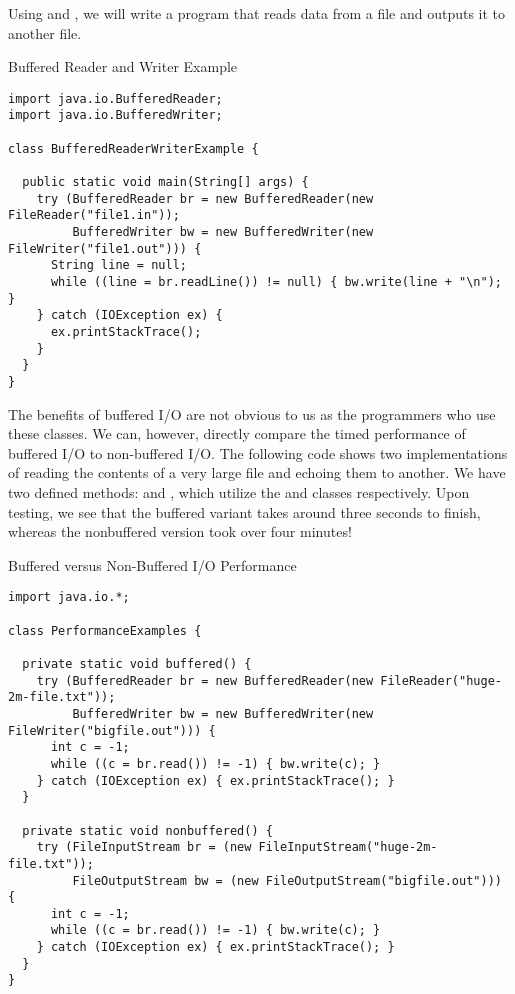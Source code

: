 \example Using  and , we will write a program that reads data from a file and outputs it to another file.

\begin{cl}{Buffered Reader and Writer Example}
\begin{lstlisting}[language=MyJava]
import java.io.BufferedReader;
import java.io.BufferedWriter;

class BufferedReaderWriterExample {

  public static void main(String[] args) {
    try (BufferedReader br = new BufferedReader(new FileReader("file1.in"));
         BufferedWriter bw = new BufferedWriter(new FileWriter("file1.out"))) {
      String line = null;
      while ((line = br.readLine()) != null) { bw.write(line + "\n"); }
    } catch (IOException ex) {
      ex.printStackTrace();
    }
  }
}
\end{lstlisting}
\end{cl}

The benefits of buffered I/O are not obvious to us as the programmers who use these classes. We can, however, directly compare the timed performance of buffered I/O to non-buffered I/O. The following code shows two implementations of reading the contents of a very large file and echoing them to another. We have two defined methods:  and , which utilize the  and  classes respectively. Upon testing, we see that the buffered variant takes around three seconds to finish, whereas the nonbuffered version took over four minutes!

\begin{cl}{Buffered versus Non-Buffered I/O Performance}
\begin{lstlisting}[language=MyJava]
import java.io.*;

class PerformanceExamples {
  
  private static void buffered() {
    try (BufferedReader br = new BufferedReader(new FileReader("huge-2m-file.txt"));
         BufferedWriter bw = new BufferedWriter(new FileWriter("bigfile.out"))) {
      int c = -1;
      while ((c = br.read()) != -1) { bw.write(c); }
    } catch (IOException ex) { ex.printStackTrace(); }
  }
  
  private static void nonbuffered() {
    try (FileInputStream br = (new FileInputStream("huge-2m-file.txt"));
         FileOutputStream bw = (new FileOutputStream("bigfile.out"))) {
      int c = -1;
      while ((c = br.read()) != -1) { bw.write(c); }
    } catch (IOException ex) { ex.printStackTrace(); }
  }
}
\end{lstlisting}
\end{cl}  

